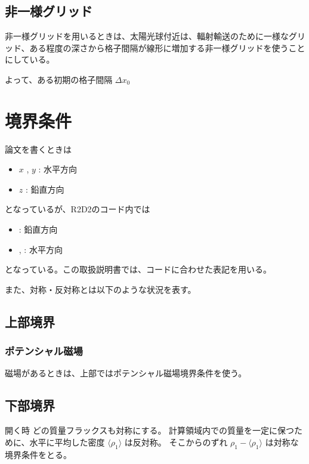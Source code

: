 \documentclass[letterpaper,10pt,dvipdfmx,report]{sphinxmanual}
\let\sphinxpxdimen\pdfpxdimen\else\newdimen\sphinxpxdimen
\begin{document}
\section{非一様グリッド}
\label{\detokenize{geometry:id3}}
非一様グリッドを用いるときは、太陽光球付近は、輻射輸送のために一様なグリッド、ある程度の深さから格子間隔が線形に増加する非一様グリッドを使うことにしている。

よって、ある初期の格子間隔 \(\Delta x_0\)


\chapter{境界条件}
\label{\detokenize{boundary:id1}}\label{\detokenize{boundary::doc}}
論文を書くときは
\begin{itemize}
\item {} 
\(x\) , \(y\) : 水平方向

\item {} 
\(z\) : 鉛直方向

\end{itemize}

となっているが、R2D2のコード内では
\begin{itemize}
\item {} 
: 鉛直方向

\item {} 
, : 水平方向

\end{itemize}

となっている。この取扱説明書では、コードに合わせた表記を用いる。

また、対称・反対称とは以下のような状況を表す。

\noindent\sphinxincludegraphics[width=450\sphinxpxdimen]{{bc_sym}.png}


\section{上部境界}
\label{\detokenize{boundary:id2}}

\subsection{ポテンシャル磁場}
\label{\detokenize{boundary:id3}}
磁場があるときは、上部ではポテンシャル磁場境界条件を使う。


\section{下部境界}
\label{\detokenize{boundary:id4}}
開く時
どの質量フラックスも対称にする。 計算領域内での質量を一定に保つために、水平に平均した密度
\(\langle \rho_1\rangle\) は反対称。 そこからのずれ
\(\rho_1 - \langle \rho_1 \rangle\) は対称な境界条件をとる。
\end{document}
